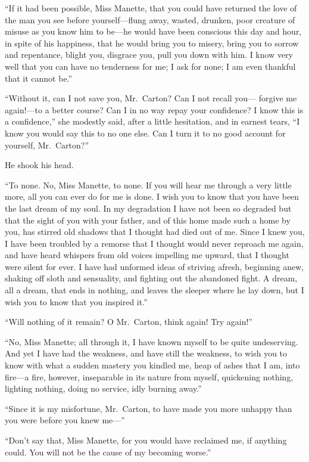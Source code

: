 ``If it had been possible, Miss Manette, that you could have returned
the love of the man you see before yourself---flung away, wasted,
drunken, poor creature of misuse as you know him to be---he would have
been conscious this day and hour, in spite of his happiness, that he
would bring you to misery, bring you to sorrow and repentance, blight
you, disgrace you, pull you down with him.  I know very well that you
can have no tenderness for me; I ask for none; I am even thankful
that it cannot be.''

``Without it, can I not save you, Mr.\ Carton?  Can I not recall you---%
forgive me again!---to a better course?  Can I in no way repay your
confidence?  I know this is a confidence,'' she modestly said, after a
little hesitation, and in earnest tears, ``I know you would say this to
no one else.  Can I turn it to no good account for yourself, Mr.\ Carton?''

He shook his head.

``To none.  No, Miss Manette, to none.  If you will hear me through a
very little more, all you can ever do for me is done.  I wish you to
know that you have been the last dream of my soul.  In my degradation
I have not been so degraded but that the sight of you with your father,
and of this home made such a home by you, has stirred old shadows that
I thought had died out of me.  Since I knew you, I have been troubled
by a remorse that I thought would never reproach me again, and have
heard whispers from old voices impelling me upward, that I thought were
silent for ever.  I have had unformed ideas of striving afresh, beginning
anew, shaking off sloth and sensuality, and fighting out the abandoned
fight.  A dream, all a dream, that ends in nothing, and leaves the
sleeper where he lay down, but I wish you to know that you inspired it.''

``Will nothing of it remain?  O Mr.\ Carton, think again!  Try again!''

``No, Miss Manette; all through it, I have known myself to be quite
undeserving.  And yet I have had the weakness, and have still the
weakness, to wish you to know with what a sudden mastery you kindled me,
heap of ashes that I am, into fire---a fire, however, inseparable
in its nature from myself, quickening nothing, lighting nothing,
doing no service, idly burning away.''

``Since it is my misfortune, Mr.\ Carton, to have made you more unhappy
than you were before you knew me---''

``Don't say that, Miss Manette, for you would have reclaimed me,
if anything could.  You will not be the cause of my becoming worse.''


